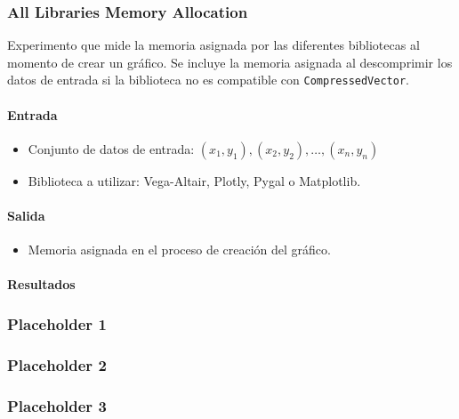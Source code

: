 \subsubsection{All Libraries Memory Allocation}
\label{all_libraries_memory_allocation}

Experimento que mide la memoria asignada por las diferentes bibliotecas al momento de crear un gráfico. Se incluye la memoria asignada al descomprimir los datos de entrada si la biblioteca no es compatible con \texttt{CompressedVector}.

\paragraph{Entrada}
\begin{itemize}
    \item Conjunto de datos de entrada: \( (x_1, y_1), (x_2, y_2), \ldots, (x_n, y_n) \)
    \item Biblioteca a utilizar: Vega-Altair, Plotly, Pygal o Matplotlib.
\end{itemize}

\paragraph{Salida}
\begin{itemize}
    \item Memoria asignada en el proceso de creación del gráfico.
\end{itemize}

\paragraph{Resultados}
\vspace{0.5em}
\noindent

\AllLibrariesMemoryAllocation

\subsubsection{Placeholder 1}
\label{vega_altair_plot_time}

\subsubsection{Placeholder 2}
\label{pygal_plot_time}

\subsubsection{Placeholder 3}
\label{vega_altair_plot_plus_build_time}

